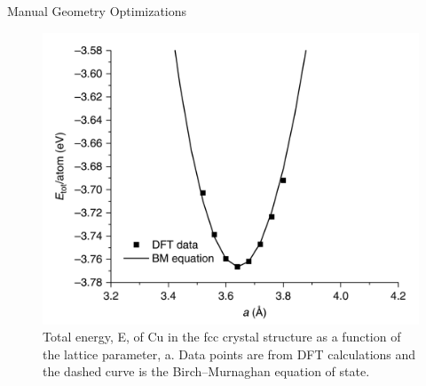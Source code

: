 \documentclass[aspectratio=169]{beamer}
\begin{document}
    \begin{frame}{Manual Geometry Optimizations}
        \begin{figure}
            \centering
            \includegraphics[width=0.45\linewidth]{lectures/figures/8_Cu_EOS.png}
            \caption{Total energy, E, of Cu in the fcc crystal structure as a function of the lattice parameter, a. Data points are from DFT calculations and the dashed curve is the Birch–Murnaghan equation of state.\cite{shollDensityFunctionalTheory2023}}
        \end{figure}
    \end{frame}
\end{document}
